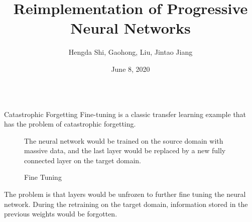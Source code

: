 \documentclass[final, hyperref={pdfpagelabels=false}]{beamer}
\title[PNN Posters]{Reimplementation of Progressive Neural Networks}
\author{Hengda Shi, Gaohong, Liu, Jintao Jiang}
\institute[UCLA CS]{Department of Computer Science, UCLA}
\date{June 8, 2020}
\begin{document}
\begin{frame}{}
\begin{columns}[t]

    \begin{column}{.30\linewidth}
    \begin{block}{Catastrophic Forgetting}
    Fine-tuning \cite{mesnil2011unsupervised} is a classic transfer learning example that has the problem of catastrophic forgetting.
    \begin{figure}
        \centering
        
        \caption{Fine Tuning}
        \label{fig:my_label} 
        \small
        The neural network would be trained on the source domain with massive data, and the last layer would be replaced by a new fully connected layer on the target domain.
    \end{figure}
    \medskip
    The problem is that layers would be unfrozen to further fine tuning the neural network. During the retraining on the target domain, information stored in the previous weights would be forgotten.
    \end{block}
    

    

\end{column}
\end{columns}
\end{frame}
\end{document}
